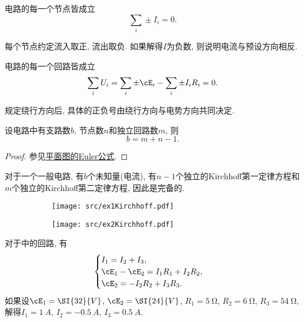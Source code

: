 \documentclass[../Electromagnetism.tex]{subfiles}
\begin{document}
\begin{finale}
	\begin{corollary}[Kirchhoff第一定律]
		电路的每一个节点皆成立
		\[ \sum_i \pm I_i = 0. \]
	\end{corollary}
\end{finale}
\begin{remark}
	每个节点约定流入取正, 流出取负. 如果解得$I$为负数, 则说明电流与预设方向相反.
\end{remark}
\begin{finale}
	\begin{corollary}[Kirchhoff第二定律]
		电路的每一个回路皆成立
		\[ \sum_i U_i = \sum_i \pm\cE_i - \sum_i \pm I_i R_i = 0. \]
	\end{corollary}
\end{finale}
\begin{remark}
	规定绕行方向后, 具体的正负号由绕行方向与电势方向共同决定.
\end{remark}
\begin{theorem}[电路的Euler公式]
	设电路中有支路数$b$, 节点数$n$和独立回路数$m$, 则
	\[ b = m + n - 1. \]
\end{theorem}
\begin{proof}
	参见\href{https://en.wikipedia.org/wiki/Planar_graph#Euler's_formula}{平面图的Euler公式}.
\end{proof}
对于一个一般电路, 有$b$个未知量(电流), 有$n-1$个独立的Kirchhoff第一定律方程和$m$个独立的Kirchhoff第二定律方程, 因此是完备的.
\begin{figure}
	\centering
	\begin{subfigure}[b]{.45\textwidth}
		\centering
		\texttt{[image: src/ex1Kirchhoff.pdf]}
		\caption{}
		\label{fig:Kirchhoff方程组求解示例1}
	\end{subfigure}
	\begin{subfigure}[b]{.45\textwidth}
		\centering
		\texttt{[image: src/ex2Kirchhoff.pdf]}
		\caption{}
		\label{fig:Kirchhoff方程组求解示例2}
	\end{subfigure}
	\caption{}
\end{figure}
\begin{ex}
	对于中的回路, 有
	\[ \begin{cases}
		I_1 = I_2 + I_3,\\
		\cE_1 - \cE_2 = I_1 R_1 + I_2 R_2,\\
		\cE_2 = -I_2 R_2 + I_3 R_3.
	\end{cases} \]
	如果设$\cE_1 = \SI{32}{V}$, $\cE_2 = \SI{24}{V}$, $R_1 = \SI{5}{\ohm}$, $R_2 = \SI{6}{\ohm}$, $R_3 = \SI{54}{\ohm}$, 解得$I_1 = \SI{1}{A}$, $I_2 = \SI{-0.5}{A}$, $I_3 = \SI{0.5}{A}$.
\end{ex}
\end{document}
